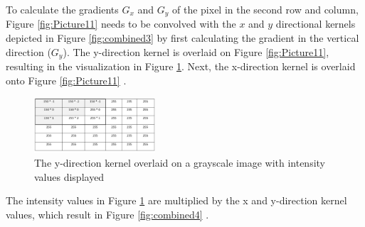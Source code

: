 \documentclass[conference]{IEEEtran}
\begin{document}
To calculate the gradients $G_x$ and $G_y$ of the pixel in the second row and column, Figure \ref{fig:Picture11} needs to be convolved with the $x$ and $y$ directional kernels depicted in Figure \ref{fig:combined3} by first calculating the gradient in the vertical direction ($G_y$). The y-direction kernel is overlaid on Figure \ref{fig:Picture11}, resulting in the visualization in Figure \ref{fig:Picture12}. Next, the x-direction kernel is overlaid onto Figure \ref{fig:Picture11} \cite{b12}. 

\begin{figure}[h]
    \centering
    \includegraphics[width=0.4\textwidth]{images/Picture12.png}
    \caption{The y-direction kernel overlaid on a grayscale image with intensity values displayed \cite{b12}}
    \label{fig:Picture12}
    
\end{figure}

The intensity values in Figure \ref{fig:Picture12} are multiplied by the x and y-direction kernel values, which result in Figure \ref{fig:combined4} \cite{b12}. 
\end{document}
